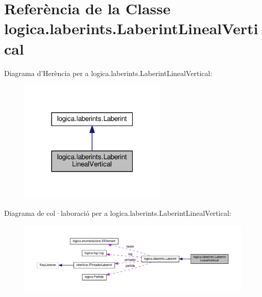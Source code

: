 \hypertarget{classlogica_1_1laberints_1_1_laberint_lineal_vertical}{\section{Referència de la Classe logica.\+laberints.\+Laberint\+Lineal\+Vertical}
\label{classlogica_1_1laberints_1_1_laberint_lineal_vertical}
}


Diagrama d'Herència per a logica.\+laberints.\+Laberint\+Lineal\+Vertical\+:\nopagebreak
\begin{figure}[H]
\begin{center}
\leavevmode
\includegraphics[width=199pt]{classlogica_1_1laberints_1_1_laberint_lineal_vertical__inherit__graph}
\end{center}
\end{figure}


Diagrama de col·laboració per a logica.\+laberints.\+Laberint\+Lineal\+Vertical\+:\nopagebreak
\begin{figure}[H]
\begin{center}
\leavevmode
\includegraphics[width=350pt]{classlogica_1_1laberints_1_1_laberint_lineal_vertical__coll__graph}
\end{center}
\end{figure}
